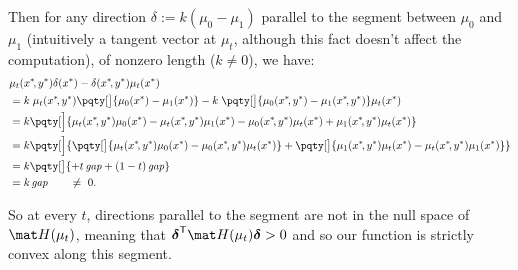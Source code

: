 \begin{lproof}
    Then for any direction $\delta := k(\mu_0 - \mu_1)$ parallel to the segment between $\mu_0$ and $\mu_1$ (intuitively a tangent vector at $\mu_t$, although this fact doesn't affect the computation), of nonzero length ($k\ne 0$), we have:
    \begin{align*}
        &
        \mu_t(x^*\!,y^*) \delta(x^*)  - \delta(x^*\!,y^*) \mu_t(x^*)
        \\
        &= k\; \mu_t(x^*\!,y^*) \pqty[\big]{\mu_0(x^*) - \mu_1(x^*)}  - k\; \pqty[\big]{\mu_0(x^*\!,y^*)-\mu_1(x^*\!,y^*)} \mu_t(x^*) \\
        &= k \pqty[\Big]{\mu_t(x^*\!,y^*)\mu_0(x^*) - \mu_t(x^*\!,y^*)\mu_1(x^*)
            -\mu_0(x^*\!,y^*)\mu_t(x^*) + \mu_1(x^*\!,y^*)\mu_t(x^*)} \\
        &= k \pqty[\Big]{ \pqty[\big]{ \mu_t(x^*\!,y^*)\mu_0(x^*) -\mu_0(x^*\!,y^*)\mu_t(x^*)} + \pqty[\big]{\mu_1(x^*\!,y^*)\mu_t(x^*) - \mu_t(x^*\!,y^*)\mu_1(x^*)}} \\
        &= k \pqty[\big]{ + t \,\mathit{gap} + (1-t) \,\mathit{gap}} \\
        &= k \,\mathit{gap} \qquad \ne~ 0. 
    \end{align*}
    
    So at every $t$, directions parallel to the segment are not in the null space of $\mat H(\mu_t)$, meaning that
    $\bdelta^{\sf T} \mat H(\mu_t) \bdelta > 0$ and so our function is strictly convex along this segment.   
\end{lproof}

